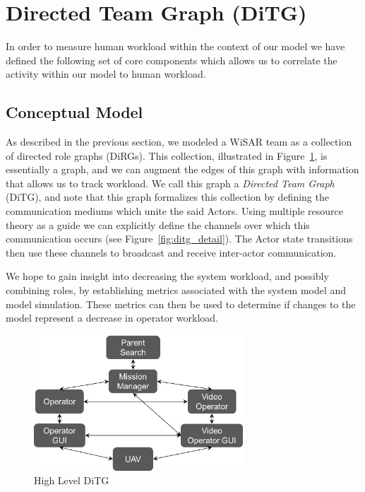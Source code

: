 \section{Directed Team Graph (DiTG)}

In order to measure human workload within the context of our model \cite{gledhill2013modelinguas} we
have defined the following set of core components which allows us to correlate
the activity within our model to human workload. 

\subsection{Conceptual Model}
As described in the previous section, we modeled a WiSAR team as a collection of directed role graphs
(DiRGs).  This collection, illustrated in Figure~\ref{fig:ditg}, is essentially a graph, and we can augment the edges of this graph with information that allows us to track workload.  We call this graph a {\em Directed Team Graph} (DiTG), and note that this graph formalizes this collection by defining the communication mediums which
unite the said Actors.  Using multiple resource theory \cite{wickens2002multiple}
as a guide we can explicitly define the channels over which this communication occurs (see Figure~\ref{fig:ditg_detail}).  The Actor state transitions then use these
channels to broadcast and receive inter-actor communication.  

We hope to gain
insight into decreasing the system workload, and possibly combining roles, by
establishing metrics associated with the system model and model simulation. 
These metrics can then be used to determine if changes to the model represent a
decrease in operator workload.

\begin{figure}
\center
\setlength{\abovecaptionskip}{1mm}
\setlength{\belowcaptionskip}{1mm}
\setlength{\textfloatsep}{1mm}
\setlength{\floatsep}{1mm}
\includegraphics[height=2in]{ditg.png}
\caption{High Level DiTG}
\label{fig:ditg}
\end{figure}


